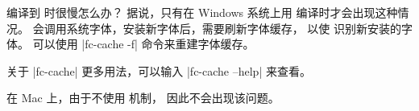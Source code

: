 \begin{myQA}{编译到  时很慢怎么办？}
	据说，只有在 Windows 系统上用  编译时才会出现这种情况。
	 会调用系统字体，安装新字体后，需要刷新字体缓存，
	以使  识别新安装的字体。
	可以使用 \code|fc-cache -f| 命令来重建字体缓存。
	
	关于 \code|fc-cache| 更多用法，可以输入 \code|fc-cache --help| 来查看。
	
	在 Mac 上，由于不使用  机制，
	因此不会出现该问题。
	
\end{myQA}



